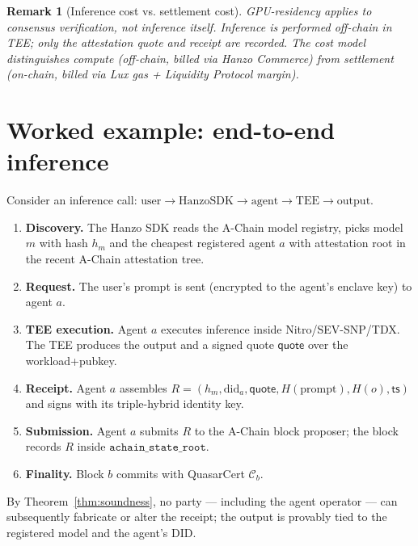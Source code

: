 \documentclass[11pt]{article}
\newtheorem{remark}{Remark}
\begin{document}
\begin{remark}[Inference cost vs. settlement cost]
GPU-residency applies to consensus verification, not inference
itself. Inference is performed off-chain in TEE; only the
attestation quote and receipt are recorded.  The cost model
distinguishes \emph{compute} (off-chain, billed via Hanzo Commerce)
from \emph{settlement} (on-chain, billed via Lux gas + Liquidity
Protocol margin).
\end{remark}

\section{Worked example: end-to-end inference}
\label{sec:example}

Consider an inference call:
$\mathrm{user} \to \mathrm{Hanzo SDK} \to \mathrm{agent} \to
 \mathrm{TEE} \to \mathrm{output}$.

\begin{enumerate}[nosep]
  \item \textbf{Discovery.} The Hanzo SDK reads the A-Chain
        model registry, picks model $m$ with hash $h_m$ and the
        cheapest registered agent $a$ with attestation root in
        the recent A-Chain attestation tree.
  \item \textbf{Request.} The user's prompt is sent (encrypted to
        the agent's enclave key) to agent $a$.
  \item \textbf{TEE execution.} Agent $a$ executes inference inside
        Nitro/SEV-SNP/TDX. The TEE produces the output and a
        signed quote $\mathsf{quote}$ over the workload+pubkey.
  \item \textbf{Receipt.} Agent $a$ assembles
        $R = (h_m, \mathrm{did}_a, \mathsf{quote},
             H(\mathrm{prompt}), H(o), \mathsf{ts})$ and signs
        with its triple-hybrid identity key.
  \item \textbf{Submission.} Agent $a$ submits $R$ to the A-Chain
        block proposer; the block records $R$ inside
        $\texttt{achain\_state\_root}$.
  \item \textbf{Finality.} Block $b$ commits with QuasarCert
        $\mathcal{C}_b$.
\end{enumerate}

By Theorem~\ref{thm:soundness}, no party --- including the agent
operator --- can subsequently fabricate or alter the receipt; the
output is provably tied to the registered model and the agent's
DID.
\end{document}

